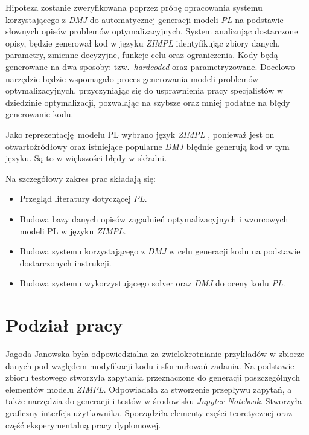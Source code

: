 Hipoteza zostanie zweryfikowana poprzez próbę opracowania systemu korzystającego z \textit{DMJ} do automatycznej generacji modeli \textit{PL} na podstawie słownych opisów problemów optymalizacyjnych. System analizując dostarczone opisy, będzie generował kod w języku \textit{ZIMPL} identyfikując zbiory danych, parametry, zmienne decyzyjne, funkcje celu oraz ograniczenia. Kody będą generowane na dwa sposoby: tzw.~\textit{hardcoded} oraz parametryzowane. Docelowo narzędzie będzie wspomagało proces generowania modeli problemów optymalizacyjnych, przyczyniając się do usprawnienia pracy specjalistów w dziedzinie optymalizacji, pozwalając na szybsze oraz mniej podatne na błędy generowanie kodu.

Jako reprezentację modelu PL wybrano język \textit{ZIMPL} \cite{TODO}, ponieważ jest on otwartoźródłowy oraz istniejące popularne \textit{DMJ} błędnie generują kod w tym języku. Są to w większości błędy w składni. %

Na szczegółowy zakres prac składają się:
\begin{itemize}
    \item Przegląd literatury dotyczącej \textit{PL}.
    \item Budowa bazy danych opisów zagadnień optymalizacyjnych i wzorcowych modeli PL w języku \textit{ZIMPL}.
    \item Budowa systemu korzystającego z \textit{DMJ} w celu generacji kodu na podstawie dostarczonych instrukcji.
    \item Budowa systemu wykorzystującego solver oraz \textit{DMJ} do oceny kodu \textit{PL}.
\end{itemize}



\section{Podział pracy}

Jagoda Janowska była odpowiedzialna za zwielokrotnianie przykładów w zbiorze danych pod względem modyfikacji kodu i sformułowań zadania. Na podstawie zbioru testowego stworzyła zapytania przeznaczone do generacji poszczególnych elementów modelu \textit{ZIMPL}. Odpowiadała za stworzenie przepływu zapytań, a także narzędzia do generacji i testów w środowisku \textit{Jupyter Notebook}. Stworzyła graficzny interfejs użytkownika. Sporządziła elementy części teoretycznej oraz część eksperymentalną pracy dyplomowej.

